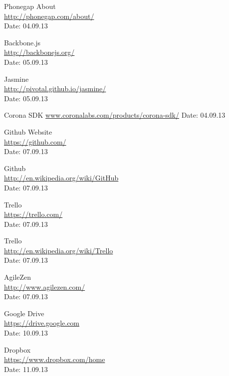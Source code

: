 \begin{thebibliography}{99}
	Phonegap About \\
	\href{http://phonegap.com/about/}{http://phonegap.com/about/} \\
	Date: 04.09.13

	Backbone.js \\
	\href{http://backbonejs.org/}{http://backbonejs.org/} \\
	Date: 05.09.13

	Jasmine \\ 
	\href{http://pivotal.github.io/jasmine/}{http://pivotal.github.io/jasmine/} \\
	Date: 05.09.13

	Corona SDK\newline
	\href {http://www.coronalabs.com/products/corona-sdk/}{www.coronalabs.com/products/corona-sdk/}\newline
	Date: 04.09.13

	Github Website\\
	\href{https://github.com/}{https://github.com/} \\
	Date: 07.09.13

	Github \\
	\href{http://en.wikipedia.org/wiki/GitHub}{http://en.wikipedia.org/wiki/GitHub} \\
	Date: 07.09.13

	Trello \\
	\href{https://trello.com/}{https://trello.com/} \\
	Date: 07.09.13

	Trello \\
	\href{http://en.wikipedia.org/wiki/Trello}{http://en.wikipedia.org/wiki/Trello} \\
	Date: 07.09.13

	AgileZen \\
	\href{http://www.agilezen.com/}{http://www.agilezen.com/} \\
	Date: 07.09.13

	Google Drive \\
	\href{https://drive.google.com}{https://drive.google.com} \\
	Date: 10.09.13

	Dropbox \\
	\href{https://www.dropbox.com/home}{https://www.dropbox.com/home} \\
	Date: 11.09.13


\end{thebibliography}

